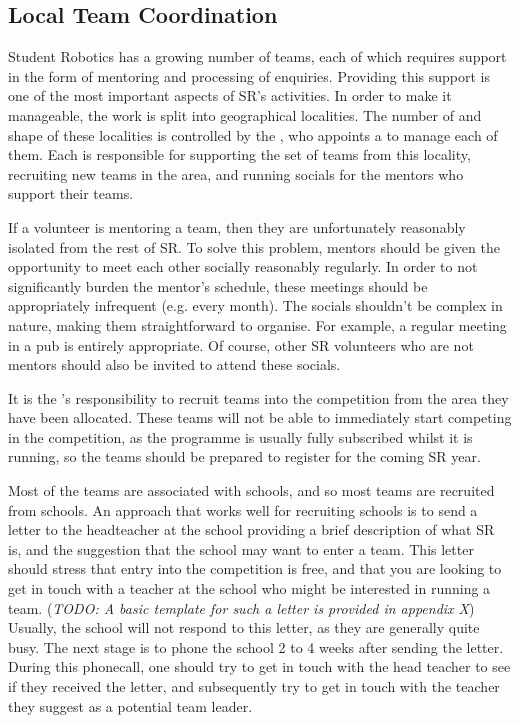 \subsection{Local Team Coordination}

Student Robotics has a growing number of teams, each of which requires support in the form of mentoring and processing of enquiries.  Providing this support is one of the most important aspects of SR's activities.  In order to make it manageable, the work is split into geographical localities.  The number of and shape of these localities is controlled by the , who appoints a  to manage each of them.  Each  is responsible for supporting the set of teams from this locality, recruiting new teams in the area, and running socials for the mentors who support their teams.

If a volunteer is mentoring a team, then they are unfortunately reasonably isolated from the rest of SR.  To solve this problem, mentors should be given the opportunity to meet each other socially reasonably regularly.  In order to not significantly burden the mentor's schedule, these meetings should be appropriately infrequent (e.g. every month).  The socials shouldn't be complex in nature, making them straightforward to organise.  For example, a regular meeting in a pub is entirely appropriate.  Of course, other SR volunteers who are not mentors should also be invited to attend these socials.

It is the 's responsibility to recruit teams into the competition from the area they have been allocated.  These teams will not be able to immediately start competing in the competition, as the programme is usually fully subscribed whilst it is running, so the teams should be prepared to register for the coming SR year.

Most of the teams are associated with schools, and so most teams are recruited from schools.  An approach that works well for recruiting schools is to send a letter to the headteacher at the school providing a brief description of what SR is, and the suggestion that the school may want to enter a team.  This letter should stress that entry into the competition is free, and that you are looking to get in touch with a teacher at the school who might be interested in running a team.  (\textit{TODO: A basic template for such a letter is provided in appendix X})  Usually, the school will not respond to this letter, as they are generally quite busy.  The next stage is to phone the school 2 to 4 weeks after sending the letter.  During this phonecall, one should try to get in touch with the head teacher to see if they received the letter, and subsequently try to get in touch with the teacher they suggest as a potential team leader.

